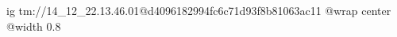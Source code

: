  
 
 
 
 

\qqSecOrig


\ifcmt
  ig tm://14_12_22.13.46.01@d4096182994fc6c71d93f8b81063ac11
  @wrap center
  @width 0.8
\fi

